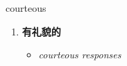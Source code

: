 
\begin{frame}
{\huge courteous}
\begin{center}
\begin{enumerate}\Large
  \item \textbf{有礼貌的}
  \begin{itemize}
    \item \em{\Large{courteous responses}}
  \end{itemize}
\end{enumerate}
\end{center}
\end{frame}
